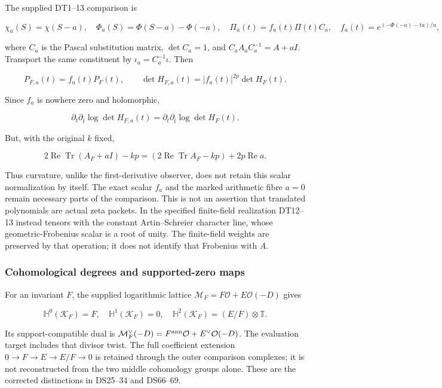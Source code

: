 The supplied DT1--13 comparison is

\[
\chi_a(S)=\chi(S-a),\quad
\Phi_a(S)=\Phi(S-a)-\Phi(-a),\quad
\Pi_a(t)=f_a(t)\Pi(t)C_a,
\quad f_a(t)=e^{(-\Phi(-a)-ta)/u},
\tag{RC46}
\]

where \(C_a\) is the Pascal substitution matrix, \(\det C_a=1\), and \(C_aA_aC_a^{-1}=A+aI\). Transport the same constituent by \(\iota_a=C_a^{-1}\iota\). Then

\[
P_{F,a}(t)=f_a(t)P_F(t),\qquad
\det H_{F,a}(t)=|f_a(t)|^{2p}\det H_F(t).
\tag{RC47}
\]

Since \(f_a\) is nowhere zero and holomorphic,

\[
\boxed{\partial_t\partial_{\bar t}\log\det H_{F,a}(t)
=\partial_t\partial_{\bar t}\log\det H_F(t).}
\tag{RC48}
\]

But, with the original \(k\) fixed,

\[
2\operatorname{Re}\operatorname{Tr}(A_F+aI)-kp
=(2\operatorname{Re}\operatorname{Tr}A_F-kp)+2p\operatorname{Re}a.
\tag{RC49}
\]

Thus curvature, unlike the first-derivative observer, does not retain this scalar normalization by itself. The exact scalar \(f_a\) and the marked arithmetic fibre \(a=0\) remain necessary parts of the comparison. This is not an assertion that translated polynomials are actual zeta packets. In the specified finite-field realization DT12--13 instead tensors with the constant Artin--Schreier character line, whose geometric-Frobenius scalar is a root of unity. The finite-field weights are preserved by that operation; it does not identify that Frobenius with \(A\).

\subsubsection{Cohomological degrees and supported-zero maps}\label{endpoint-residue_original--cohomological-degrees-and-supported-zero-maps}

For an invariant \(F\), the supplied logarithmic lattice \(\mathcal M_F=F\mathcal O+E\mathcal O(-D)\) gives

\[
\mathbb H^0(\mathcal K_F)=F,\quad
\mathbb H^1(\mathcal K_F)=0,\quad
\mathbb H^2(\mathcal K_F)=(E/F)\otimes\mathbb T.
\tag{RC50}
\]

Its support-compatible dual is \(\mathcal M_F^\vee(-D)=F^{\rm ann}\mathcal O+E^\vee\mathcal O(-D)\). The evaluation target includes that divisor twist. The full coefficient extension \(0\to F\to E\to E/F\to0\) is retained through the outer comparison complexes; it is not reconstructed from the two middle cohomology groups alone. These are the corrected distinctions in DS25--34 and DS66--69.

